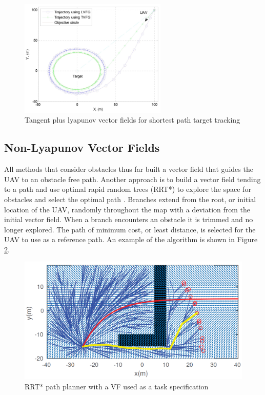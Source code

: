 \documentclass[numbered,pdftex]{ohio-etd}
\begin{document}
\begin{figure}
	\centering
	\includegraphics[width=7cm]{PaperFigures/lyapunovChen}
	\caption{Tangent plus lyapunov vector fields for shortest path target tracking \cite{chen_uav_2013}}
	\label{fig:lyapunovChen}
\end{figure}


\subsection{Non-Lyapunov Vector Fields}
All methods that consider obstacles thus far built a vector field that guides the UAV to an obstacle free path. Another approach is to build a vector field tending to a path and use optimal rapid random trees (RRT*) to explore the space for obstacles and select the optimal path \cite{pereira_framework_2016}. Branches extend from the root, or initial location of the UAV, randomly throughout the map with a \cite{wwc} deviation from the initial vector field. When a branch encounters an obstacle it is trimmed and no longer explored. The path of minimum cost, or least distance, is selected for the UAV to use as a reference path. An example of the algorithm is shown in Figure \ref{fig:rrtvf}.

\begin{figure}
	\centering
	\includegraphics[width=12cm]{PaperFigures/rrtVF}
	\caption{RRT* path planner with a VF used as a task specification \cite{pereira_framework_2016}}
	\label{fig:rrtvf}
\end{figure}
\end{document}
